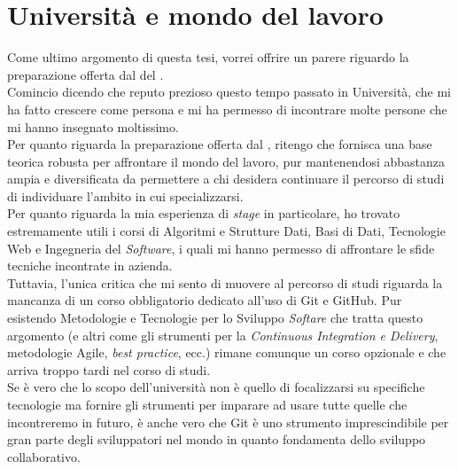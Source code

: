 \section{Università e mondo del lavoro}
Come ultimo argomento di questa tesi, vorrei offrire un parere riguardo la preparazione offerta 
dal {\myFaculty} del {\myUni}.\\
Comincio dicendo che reputo prezioso questo tempo passato in Università, che mi ha fatto crescere 
come persona e mi ha permesso di incontrare molte persone che mi hanno insegnato moltissimo.\\
Per quanto riguarda la preparazione offerta dal {\myFaculty}, ritengo che fornisca una base 
teorica robusta per affrontare il mondo del lavoro, pur mantenendosi abbastanza ampia e diversificata da permettere 
a chi desidera continuare il percorso di studi di individuare l'ambito in cui specializzarsi.\\
Per quanto riguarda la mia esperienza di \textit{stage} in particolare, ho trovato estremamente utili i corsi di 
Algoritmi e Strutture Dati, Basi di Dati, Tecnologie Web e Ingegneria del \textit{Software}, i quali mi 
hanno permesso di affrontare le sfide tecniche incontrate in azienda.\\
Tuttavia, l'unica critica che mi sento di muovere al percorso di studi riguarda la mancanza di un corso obbligatorio 
dedicato all'uso di Git e GitHub. Pur esistendo Metodologie e Tecnologie per lo Sviluppo 
\textit{Softare} che tratta questo argomento (e altri come gli strumenti per la 
\textit{Continuous Integration e Delivery}, metodologie Agile, \textit{best practice}, ecc.) rimane 
comunque un corso opzionale e che arriva troppo tardi nel corso di studi.\\
Se è vero che lo scopo dell'università non è quello di focalizzarsi su specifiche tecnologie ma 
fornire gli strumenti per imparare ad usare tutte quelle che incontreremo in futuro, è 
anche vero che Git è uno strumento imprescindibile per gran parte degli sviluppatori nel mondo 
in quanto fondamenta dello sviluppo collaborativo.